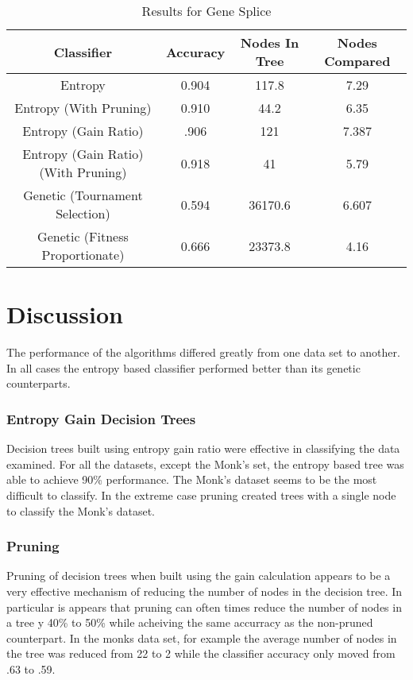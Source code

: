 \documentclass[12pt,letterpaper]{article}
\begin{document}
\begin{table}[h]
\begin{tabular}{ |c|c|c|c| }
\hline
Classifier  &   Accuracy & Nodes In Tree  & Nodes Compared\\
\hline
Entropy & 0.904 & 117.8 &  7.29 \\
Entropy (With Pruning) &  0.910 & 44.2 & 6.35 \\
Entropy (Gain Ratio)  & .906 & 121 & 7.387 \\
Entropy (Gain Ratio) (With Pruning) &0.918 & 41 & 5.79 \\
\hline
Genetic (Tournament Selection) & 0.594 &36170.6 & 6.607\\
Genetic (Fitness Proportionate) &0.666 & 23373.8 & 4.16 \\
\hline
\end{tabular}
\caption{Results for Gene Splice }
\end{table}


\section{Discussion}

The performance of the algorithms differed greatly from one data set to another. In all cases the entropy based classifier performed better than its genetic counterparts. 
\subsubsection*{Entropy Gain Decision Trees}
Decision trees built using entropy gain ratio were effective in classifying the data examined. For all the datasets, except the Monk's set, the entropy based tree was able to achieve 90\% performance. The Monk's dataset seems to be the most difficult to classify. In the extreme case pruning created trees with a single node to classify the Monk's dataset. 

\subsubsection*{Pruning}
Pruning of decision trees when built using the gain calculation appears to be a very effective mechanism of reducing the number of nodes in the decision tree. In particular is appears that pruning can often times reduce the number of nodes in a tree y 40\% to 50\% while acheiving the same accurracy as the non-pruned counterpart. In the monks data set, for example the average number of nodes in the tree was reduced from 22 to 2 while the classifier accuracy only moved from .63 to .59. 
\end{document}
